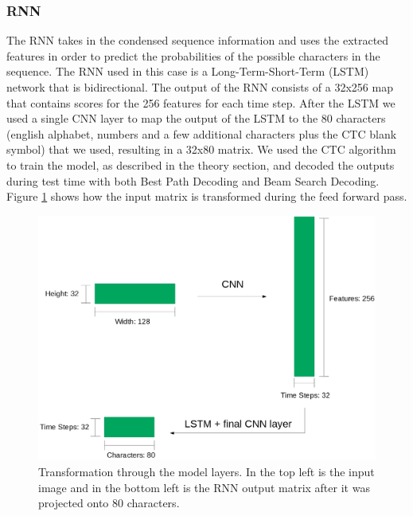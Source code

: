 \documentclass{article}
\begin{document}
\subsubsection{RNN}
The RNN takes in the condensed sequence information and uses the extracted features in order to predict the probabilities of the possible characters in the sequence. The RNN used in this case is a Long-Term-Short-Term (LSTM) network that is bidirectional. The output of the RNN consists of a 32x256 map that contains scores for the 256 features for each time step. After the LSTM we used a single CNN layer to map the output of the LSTM to the 80 characters (english alphabet, numbers and a few additional characters plus the CTC blank symbol) that we used, resulting in a 32x80 matrix. We used the CTC algorithm to train the model, as described in the theory section, and decoded the outputs during test time with both Best Path Decoding and Beam Search Decoding. Figure \ref{fig:featureshapes} shows how the input matrix is transformed during the feed forward pass.
\begin{figure}[H]
\begin{center}
\includegraphics[scale=0.25]{rsz_pipeline}
\end{center}
\caption{Transformation through the model layers. In the top left is the input image and in the bottom left is the RNN output matrix after it was projected onto 80 characters.}
\label{fig:featureshapes}
\end{figure}
\end{document}
